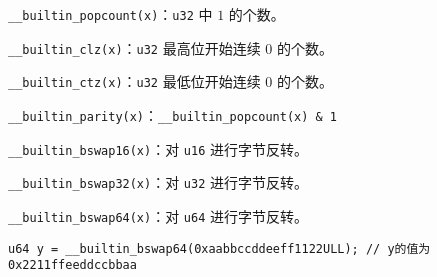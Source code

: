 \texttt{\_\_builtin\_popcount{\color{red}{ll}}(x)}：\texttt{u32{\color{red}{/u64}}} 中 $1$ 的个数。

\texttt{\_\_builtin\_clz{\color{red}{ll}}(x)}：\texttt{u32{\color{red}{/u64}}} 最高位开始连续 $0$ 的个数。

\texttt{\_\_builtin\_ctz{\color{red}{ll}}(x)}：\texttt{u32{\color{red}{/u64}}} 最低位开始连续 $0$ 的个数。

\texttt{\_\_builtin\_parity{\color{red}{ll}}(x)}：\texttt{\_\_builtin\_popcount{\color{red}{ll}}(x) \& 1}

\texttt{\_\_builtin\_bswap16(x)}：对 \texttt{u16} 进行字节反转。

\texttt{\_\_builtin\_bswap32(x)}：对 \texttt{u32} 进行字节反转。

\texttt{\_\_builtin\_bswap64(x)}：对 \texttt{u64} 进行字节反转。

\begin{verbatim}
u64 y = __builtin_bswap64(0xaabbccddeeff1122ULL); // y的值为0x2211ffeeddccbbaa
\end{verbatim}
